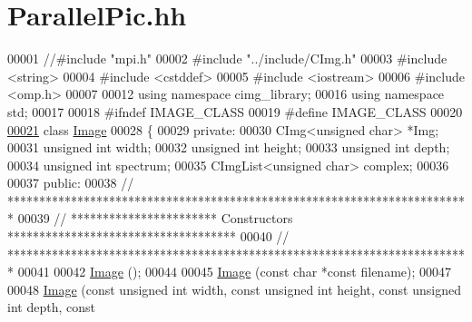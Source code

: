 \hypertarget{_parallel_pic_8hh}{\section{Parallel\-Pic.\-hh}
\label{_parallel_pic_8hh}
}

\begin{DoxyCode}
00001 \textcolor{comment}{//#include "mpi.h"}
00002 \textcolor{preprocessor}{#include "../include/CImg.h"}
00003 \textcolor{preprocessor}{#include <string>}
00004 \textcolor{preprocessor}{#include <cstddef>}
00005 \textcolor{preprocessor}{#include <iostream>}
00006 \textcolor{preprocessor}{#include <omp.h>}
00007 
00012 \textcolor{keyword}{using namespace }cimg\_library;
00016 \textcolor{keyword}{using namespace }std;
00017 
00018 \textcolor{preprocessor}{#ifndef IMAGE\_CLASS}
00019 \textcolor{preprocessor}{}\textcolor{preprocessor}{#define IMAGE\_CLASS}
00020 \textcolor{preprocessor}{}
\hypertarget{_parallel_pic_8hh_source_l00021}{}\hyperlink{class_image}{00021} \textcolor{keyword}{class }\hyperlink{class_image}{Image}
00028 \{
00029 \textcolor{keyword}{private}:
00030     CImg<unsigned char> *Img; 
00031     \textcolor{keywordtype}{unsigned} \textcolor{keywordtype}{int} width; 
00032     \textcolor{keywordtype}{unsigned} \textcolor{keywordtype}{int} height; 
00033     \textcolor{keywordtype}{unsigned} \textcolor{keywordtype}{int} depth; 
00034     \textcolor{keywordtype}{unsigned} \textcolor{keywordtype}{int} spectrum; 
00035     CImgList<unsigned char> complex; 
00036     
00037 \textcolor{keyword}{public}:
00038 \textcolor{comment}{// *************************************************************************}
00039 \textcolor{comment}{// *********************** Constructors ************************************}
00040 \textcolor{comment}{// *************************************************************************}
00041 
00042     \hyperlink{class_image}{Image} ();
00044     
00045     \hyperlink{class_image}{Image} (\textcolor{keyword}{const} \textcolor{keywordtype}{char} *\textcolor{keyword}{const} filename);
00047     
00048     \hyperlink{class_image}{Image} (\textcolor{keyword}{const} \textcolor{keywordtype}{unsigned} \textcolor{keywordtype}{int} width, \textcolor{keyword}{const} \textcolor{keywordtype}{unsigned} \textcolor{keywordtype}{int} height, \textcolor{keyword}{const} \textcolor{keywordtype}{unsigned} \textcolor{keywordtype}{int} depth, \textcolor{keyword}{const} \textcolor{keywordtype}{
}
\end{DoxyCode}
